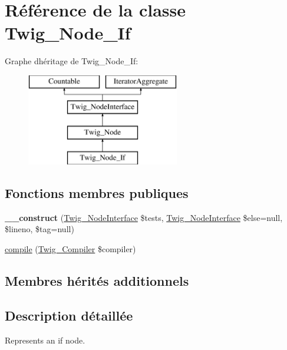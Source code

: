 \hypertarget{class_twig___node___if}{}\section{Référence de la classe Twig\+\_\+\+Node\+\_\+\+If}
\label{class_twig___node___if}
Graphe d\textquotesingle{}héritage de Twig\+\_\+\+Node\+\_\+\+If\+:\begin{figure}[H]
\begin{center}
\leavevmode
\includegraphics[height=4.000000cm]{class_twig___node___if}
\end{center}
\end{figure}
\subsection*{Fonctions membres publiques}
\begin{DoxyCompactItemize}
\item 
{\bfseries \+\_\+\+\_\+construct} (\hyperlink{interface_twig___node_interface}{Twig\+\_\+\+Node\+Interface} \$tests, \hyperlink{interface_twig___node_interface}{Twig\+\_\+\+Node\+Interface} \$else=null, \$lineno, \$tag=null)\hypertarget{class_twig___node___if_a1648ddaaa3a887d40354ef06784bd0a9}{}\label{class_twig___node___if_a1648ddaaa3a887d40354ef06784bd0a9}

\item 
\hyperlink{class_twig___node___if_a4e0faa87c3fae583620b84d3607085da}{compile} (\hyperlink{class_twig___compiler}{Twig\+\_\+\+Compiler} \$compiler)
\end{DoxyCompactItemize}
\subsection*{Membres hérités additionnels}


\subsection{Description détaillée}
Represents an if node.

